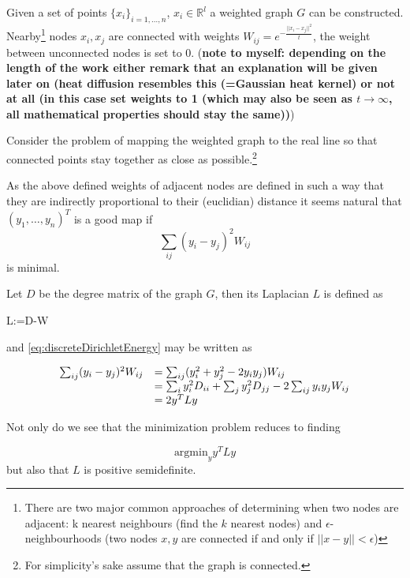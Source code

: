 Given a set of points $\{x_i\}_{i=1,\dots,n}$, $x_i \in \mathbb{R}^l$ a weighted graph $G$ can be constructed. Nearby\footnote{There are two major common approaches of determining when two nodes are adjacent: k nearest neighbours (find the $k$ nearest nodes) and $\epsilon$-neighbourhoods (two nodes $x,y$ are connected if and only if $||x-y||<\epsilon$)} nodes $x_i,x_j$ are connected with weights $W_{ij}=e^{-\frac{||x_i - x_j||^2}{t}}$, the weight between unconnected nodes is set to $0$. (\textbf{note to myself: depending on the length of the work either remark that an explanation will be given later on (heat diffusion resembles this (=Gaussian heat kernel) or not at all (in this case set weights to 1 (which may also be seen as $t\rightarrow \infty$, all mathematical properties should stay the same))})

Consider the problem of mapping the weighted graph to the real line so that connected points stay together as close as possible.\footnote{For simplicity's sake assume that the graph is connected.}

As the above defined weights of adjacent nodes are defined in such a way that they are indirectly proportional to their (euclidian) distance it seems natural that $(y_1,\dots,y_n)^T$ is a good map if
\begin{equation} \label{eq:discreteDirichletEnergy}
    \sum _{ij} (y_i - y_j)^2 W_{ij}
\end{equation}
is minimal.

Let $D$ be the degree matrix of the graph $G$, then its Laplacian $L$ is defined as
\begin{definition}
    L:=D-W
\end{definition}

and \eqref{eq:discreteDirichletEnergy} may be written as 

\begin{equation*}\begin{array}{l l}
\sum _{ij} (y_i - y_j)^2 W_{ij} &= \sum _{ij} (y_i^2 + y_j^2 - 2y_i y_j) W_{ij}\\
    &= \sum _{i} y_i^2 D_{ii} + \sum _{j} y_j^2 D_{jj} - 2\sum _{ij} y_i y_j W_{ij}\\
    &= 2y^TLy
\end{array}\end{equation*}

Not only do we see that the minimization problem reduces to finding

\begin{equation*}
    \text{argmin}_y y^TLy
\end{equation*}
but also that $L$ is positive semidefinite.


